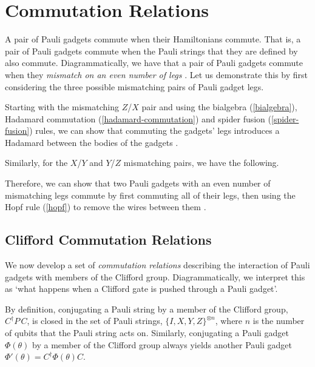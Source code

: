 \section{Commutation Relations}%
\label{commutation-relations}

A pair of Pauli gadgets commute when their Hamiltonians commute. That is, a pair of Pauli gadgets commute when the Pauli strings that they are defined by also commute. Diagrammatically, we have that a pair of Pauli gadgets commute when they \textit{mismatch on an even number of legs} \cite{Yeung2020}. Let us demonstrate this by first considering the three possible mismatching pairs of Pauli gadget legs.


Starting with the mismatching $Z$/$X$ pair and using the bialgebra (\ref{bialgebra}), Hadamard commutation (\ref{hadamard-commutation}) and spider fusion (\ref{spider-fusion}) rules, we can show that commuting the gadgets' legs introduces a Hadamard between the bodies of the gadgets \cite{Yeung2020}.


Similarly, for the $X$/$Y$ and $Y$/$Z$ mismatching pairs, we have the following.


Therefore, we can show that two Pauli gadgets with an even number of mismatching legs commute by first commuting all of their legs, then using the Hopf rule (\ref{hopf}) to remove the wires between them \cite{Yeung2020}.


\subsection{Clifford Commutation Relations}%
\label{clifford-commutation-relations}

We now develop a set of \textit{commutation relations} describing the interaction of Pauli gadgets with members of the Clifford group. Diagrammatically, we interpret this as `what happens when a Clifford gate is pushed through a Pauli gadget'.

By definition, conjugating a Pauli string by a member of the Clifford group, $C^\dagger P \, C$, is closed in the set of Pauli strings, $\{I, X, Y, Z\}^{\otimes n}$, where $n$ is the number of qubits that the Pauli string acts on. Similarly, conjugating a Pauli gadget $\Phi(\theta)$ by a member of the Clifford group always yields another Pauli gadget $\Phi'(\theta) = C^\dagger \Phi(\theta) C$.

